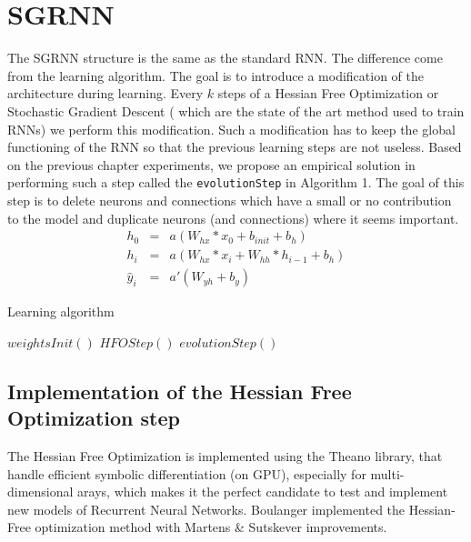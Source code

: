 \section{SGRNN}

The SGRNN structure is the same as the standard RNN. The difference come from the learning algorithm. The goal is to introduce a modification of the architecture during learning. Every $k$ steps of a Hessian Free Optimization or Stochastic Gradient Descent ( which are the state of the art method used to train RNNs) we perform this modification. Such a modification has to keep the global functioning of the RNN so that the previous learning steps are not useless. Based on the previous chapter experiments, we propose an empirical solution in performing such a step called the \verb?evolutionStep? in Algorithm 1. The goal of this step is to delete neurons and connections which have a small or no contribution to the model and duplicate neurons (and connections) where it seems important.   
$$
\begin{array}{rcr} 
    h_0 & = & a(W_{hx}  * x_0 + b_{init} + b_h)  \\ 
    h_i & = & a(W_{hx}  * x_i + W _{hh} * h_{i-1} + b_h)  \\ 
    \hat{y}_i & = & a'(W_{yh} + b_y)

\end{array}
$$


\begin{algorithm}
    \caption{Learning algorithm}
    \begin{algorithmic}
    \STATE $ weightsInit() $
            \STATE $HFOStep()$
        \ENDFOR
        \STATE $evolutionStep()$
    \ENDWHILE
    
    \end{algorithmic}
\end{algorithm}

\subsection{Implementation of the Hessian Free Optimization step}
The Hessian Free Optimization \cite{martens2011learning} is implemented using the Theano library, that handle efficient symbolic differentiation (on GPU), especially for multi-dimensional arays, which makes it the perfect candidate to test and implement new models of Recurrent Neural Networks. Boulanger \cite{boulanger2012modeling} implemented the Hessian-Free optimization method with Martens \& Sutskever \cite{martens2011learning} improvements. 

